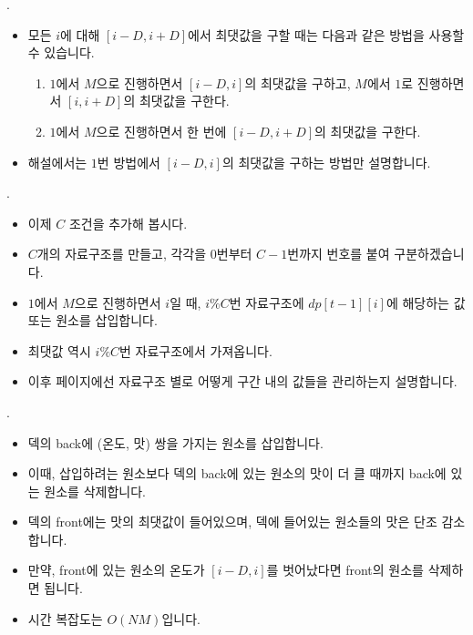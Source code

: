 \begin{frame}{\probno{}. \probtitle{}}
    \begin{itemize}
        \item 모든 $i$에 대해 $[i-D, i+D]$에서 최댓값을 구할 때는 다음과 같은 방법을 사용할 수 있습니다.
        \begin{enumerate}
            \item $1$에서 $M$으로 진행하면서 $[i-D, i]$의 최댓값을 구하고, $M$에서 $1$로 진행하면서 $[i, i+D]$의 최댓값을 구한다.
            \item $1$에서 $M$으로 진행하면서 한 번에 $[i-D, i+D]$의 최댓값을 구한다.
        \end{enumerate}
        \vspace{3mm}
        \item 해설에서는 $1$번 방법에서 $[i-D, i]$의 최댓값을 구하는 방법만 설명합니다.
    \end{itemize}
\end{frame}

\begin{frame}{\probno{}. \probtitle{}}
    \begin{itemize}
        \item 이제 $C$ 조건을 추가해 봅시다.
        \item $C$개의 자료구조를 만들고, 각각을 $0$번부터 $C-1$번까지 번호를 붙여 구분하겠습니다.
        \item $1$에서 $M$으로 진행하면서 $i$일 때, $i\%C$번 자료구조에 $dp[t-1][i]$에 해당하는 값 또는 원소를 삽입합니다.
        \item 최댓값 역시 $i\%C$번 자료구조에서 가져옵니다.
        \vspace{3mm}
        \item 이후 페이지에선 자료구조 별로 어떻게 구간 내의 값들을 관리하는지 설명합니다.
    \end{itemize}
\end{frame}

\begin{frame}{\probno{}. }
    \begin{itemize}
        \item 덱의 back에 (온도, 맛) 쌍을 가지는 원소를 삽입합니다.
        \item 이때, 삽입하려는 원소보다 덱의 back에 있는 원소의 맛이 더 클 때까지 back에 있는 원소를 삭제합니다.
        \item 덱의 front에는 맛의 최댓값이 들어있으며, 덱에 들어있는 원소들의 맛은 단조 감소합니다.
        \item 만약, front에 있는 원소의 온도가 $[i-D, i]$를 벗어났다면 front의 원소를 삭제하면 됩니다.
        \item 시간 복잡도는 $O(NM)$입니다.
    \end{itemize}
\end{frame}

